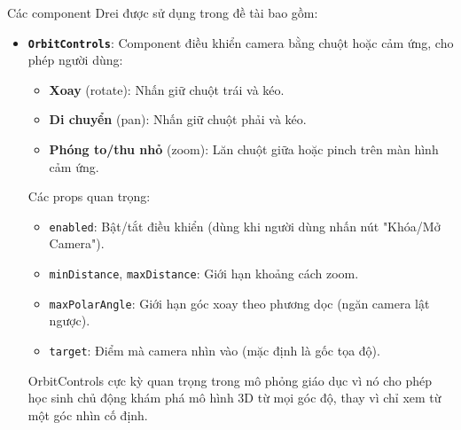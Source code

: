 Các component Drei được sử dụng trong đề tài bao gồm:

\begin{itemize}
    \item \textbf{\texttt{OrbitControls}}: Component điều khiển camera bằng chuột hoặc cảm ứng, cho phép người dùng:
    \begin{itemize}
        \item \textbf{Xoay} (rotate): Nhấn giữ chuột trái và kéo.
        \item \textbf{Di chuyển} (pan): Nhấn giữ chuột phải và kéo.
        \item \textbf{Phóng to/thu nhỏ} (zoom): Lăn chuột giữa hoặc pinch trên màn hình cảm ứng.
    \end{itemize}
    Các props quan trọng:
    \begin{itemize}
        \item \texttt{enabled}: Bật/tắt điều khiển (dùng khi người dùng nhấn nút "Khóa/Mở Camera").
        \item \texttt{minDistance}, \texttt{maxDistance}: Giới hạn khoảng cách zoom.
        \item \texttt{maxPolarAngle}: Giới hạn góc xoay theo phương dọc (ngăn camera lật ngược).
        \item \texttt{target}: Điểm mà camera nhìn vào (mặc định là gốc tọa độ).
    \end{itemize}
    OrbitControls cực kỳ quan trọng trong mô phỏng giáo dục vì nó cho phép học sinh chủ động khám phá mô hình 3D từ mọi góc độ, thay vì chỉ xem từ một góc nhìn cố định.
    

\end{itemize}
